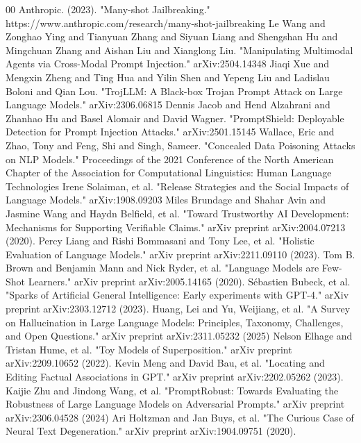 \documentclass[conference]{IEEEtran}
\begin{document}
\begin{thebibliography}{00}
  Anthropic. (2023). "Many-shot Jailbreaking." https://www.anthropic.com/research/many-shot-jailbreaking
 Le Wang and Zonghao Ying and Tianyuan Zhang and Siyuan Liang and Shengshan Hu and Mingchuan Zhang and Aishan Liu and Xianglong Liu. "Manipulating Multimodal Agents via Cross-Modal Prompt Injection." arXiv:2504.14348
 Jiaqi Xue and Mengxin Zheng and Ting Hua and Yilin Shen and Yepeng Liu and Ladislau Boloni and Qian Lou. "TrojLLM: A Black-box Trojan Prompt Attack on Large Language Models."	arXiv:2306.06815
 Dennis Jacob and Hend Alzahrani and Zhanhao Hu and Basel Alomair and David Wagner. "PromptShield: Deployable Detection for Prompt Injection Attacks."	arXiv:2501.15145
 Wallace, Eric and Zhao, Tony  and Feng, Shi  and Singh, Sameer. "Concealed Data Poisoning Attacks on {NLP} Models." Proceedings of the 2021 Conference of the North American Chapter of the Association for Computational Linguistics: Human Language Technologies
 Irene Solaiman, et al. "Release Strategies and the Social Impacts of Language Models." arXiv:1908.09203
 Miles Brundage and Shahar Avin and Jasmine Wang and Haydn Belfield, et al. "Toward Trustworthy AI Development: Mechanisms for Supporting Verifiable Claims." arXiv preprint arXiv:2004.07213 (2020).
 Percy Liang and Rishi Bommasani and Tony Lee, et al. "Holistic Evaluation of Language Models." arXiv preprint arXiv:2211.09110 (2023).
 Tom B. Brown and Benjamin Mann and Nick Ryder, et al. "Language Models are Few-Shot Learners." arXiv preprint arXiv:2005.14165 (2020).
 Sébastien Bubeck, et al. "Sparks of Artificial General Intelligence: Early experiments with GPT-4." arXiv preprint arXiv:2303.12712 (2023).
 Huang, Lei and Yu, Weijiang, et al. "A Survey on Hallucination in Large Language Models: Principles, Taxonomy, Challenges, and Open Questions." arXiv preprint arXiv:2311.05232 (2025)
 Nelson Elhage and Tristan Hume, et al. "Toy Models of Superposition." arXiv preprint arXiv:2209.10652 (2022).
 Kevin Meng and David Bau, et al. "Locating and Editing Factual Associations in GPT." arXiv preprint arXiv:2202.05262 (2023).
 Kaijie Zhu and Jindong Wang, et al. "PromptRobust: Towards Evaluating the Robustness of Large Language Models on Adversarial Prompts." arXiv preprint arXiv:2306.04528 (2024)
 Ari Holtzman and Jan Buys, et al. "The Curious Case of Neural Text Degeneration." arXiv preprint arXiv:1904.09751 (2020).


\end{thebibliography}
\end{document}
